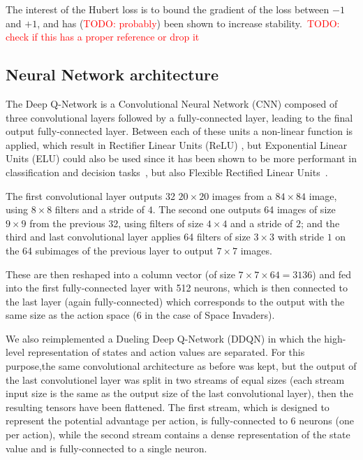 \documentclass[letterpaper]{article}
\newcommand\todo[1]{\textcolor{red}{TODO: #1}}
\begin{document}
The interest of the Hubert loss is to bound the gradient of the loss between $-1$ and $+1$, and has (\todo {probably}) been shown to increase
stability.~\todo{check if this has a proper reference or drop it}

\subsection{Neural Network architecture}

The Deep Q-Network is a Convolutional Neural Network (CNN) composed of three convolutional layers followed by a fully-connected layer, 
leading to the final output fully-connected layer.
Between each of these units a non-linear function is applied, which result in Rectifier Linear Units (ReLU) \citep{krizhevsky2012imagenet}, but Exponential Linear Units (ELU) could
also be used since it has been shown to be more performant in classification and decision tasks~\citep{DBLP:journals/corr/ClevertUH15}, but also
Flexible Rectified Linear Units~\citep{qiu2017flexible}.

The first convolutional layer outputs 32 $20 \times 20$ images from a $84 \times 84$ image, using $8 \times 8$ filters and a stride of $4$. The second one outputs
64 images of size $9 \times 9$ from the previous 32, using filters of size $4 \times 4$ and a stride of $2$; and the third and last convolutional layer
applies 64 filters of size $3 \times 3$ with stride $1$ on the 64 subimages of the previous layer to output $7 \times 7$ images.

These are then reshaped into a column vector (of size $7 \times 7 \times 64 = 3136$) and fed into the first fully-connected layer with 512 neurons,
which is then connected to the last layer (again fully-connected) which corresponds to the output with the same size as the action space (6 in the
case of Space Invaders).

We also reimplemented a Dueling Deep Q-Network (DDQN) in which the high-level representation of states and action values are separated.
For this purpose,the same convolutional architecture as before was kept, but the output of the last convolutionel layer was split in two streams of
equal sizes (each stream input size is the same as the output size of the last convolutional layer), then the resulting tensors have been flattened.
The first stream, which is designed to represent the potential advantage per action, is fully-connected to 6 neurons (one per action), while the second stream
contains a dense representation of the state value and is fully-connected to a single neuron.
\end{document}
